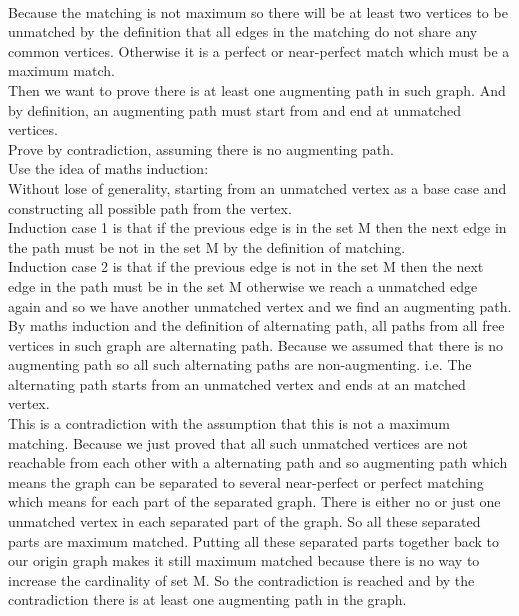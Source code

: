 \documentclass[10pt,twoside,a4paper]{article}
\begin{document}
\begin{itemize}
\\Because the matching is not maximum so there will be at least two vertices to be unmatched by the definition that all edges in the matching do not share any common vertices. Otherwise it is a perfect or near-perfect match which must be a maximum match.
\\Then we want to prove there is at least one augmenting path in such graph. And by definition, an augmenting path must start from and end at unmatched vertices.
\\Prove by contradiction, assuming there is no augmenting path. 
\\Use the idea of maths induction:
\\Without lose of generality, starting from an unmatched vertex as a base case and constructing all possible path from the vertex. 
\\Induction case 1 is that if the previous edge is in the set M then the next edge in the path must be not in the set M by the definition of matching.
\\Induction case 2 is that if the previous edge is not in the set M then the next edge in the path must be in the set M otherwise we reach a unmatched edge again and so we have another unmatched vertex and we find an augmenting path.
\\By maths induction and the definition of alternating path, all paths from all free vertices in such graph are alternating path. Because we assumed that there is no augmenting path so all such alternating paths are non-augmenting. i.e. The alternating path starts from an unmatched vertex and ends at an matched vertex. 
\\This is a contradiction with the assumption that this is not a maximum matching. Because we just proved that all such unmatched vertices are not reachable from each other with a alternating path and so augmenting path which means the graph can be separated to several near-perfect or perfect matching which means for each part of the separated graph. There is either no or just one unmatched vertex in each separated part of the graph. So all these separated parts are maximum matched. Putting all these separated parts together back to our origin graph makes it still maximum matched because there is no way to increase the cardinality of set M. So the contradiction is reached and by the contradiction there is at least one augmenting path in the graph.


\end{itemize}
\end{document}

